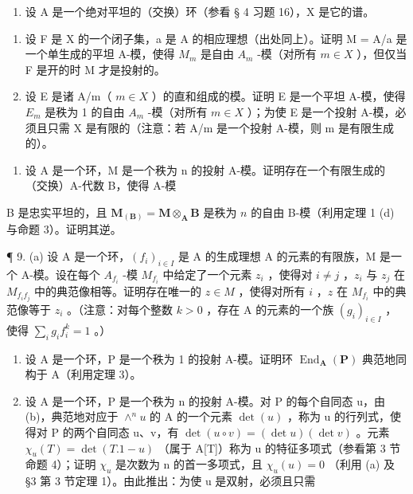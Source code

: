 \begin{enumerate}
\def\labelenumi{\arabic{enumi}.}
\setcounter{enumi}{6}
\tightlist
\item
  设 A 是一个绝对平坦的（交换）环（参看 § 4 习题 16），X 是它的谱。
\end{enumerate}

\begin{enumerate}
\def\labelenumi{(\alph{enumi})}
\item
  设 F 是 X 的一个闭子集，a 是 A 的相应理想（出处同上）。证明 M = A/a 是一个单生成的平坦 A-模，使得 \(M_{m}\) 是自由 \(A_{m}\) -模（对所有 \(m \in X\) ），但仅当 F 是开的时 M 才是投射的。
\item
  设 E 是诸 A/m（ \(m \in X\) ）的直和组成的模。证明 E 是一个平坦 A-模，使得 \(E_{m}\) 是秩为 1 的自由 \(A_{m}\) -模（对所有 \(m \in X\) ）；为使 E 是一个投射 A-模，必须且只需 X 是有限的（注意：若 A/m 是一个投射 A-模，则 m 是有限生成的）。
\end{enumerate}

\begin{enumerate}
\def\labelenumi{\arabic{enumi}.}
\setcounter{enumi}{7}
\tightlist
\item
  设 A 是一个环，M 是一个秩为 n 的投射 A-模。证明存在一个有限生成的（交换）A-代数 B，使得 A-模
\end{enumerate}

B 是忠实平坦的，且 \(\mathbf{M}_{(\mathbf{B})} = \mathbf{M} \otimes_{\mathbf{A}} \mathbf{B}\) 是秩为 \(n\) 的自由 B-模（利用定理 1 (d) 与命题 3）。证明其逆。

¶ 9. (a) 设 A 是一个环，\((f_i)_{i \in I}\) 是 A 的生成理想 A 的元素的有限族，M 是一个 A-模。设在每个 \(A_{f_i}\) -模 \(M_{f_i}\) 中给定了一个元素 \(z_i\) ，使得对 \(i \neq j\) ，\(z_i\) 与 \(z_j\) 在 \(M_{f_i f_j}\) 中的典范像相等。证明存在唯一的 \(z \in M\) ，使得对所有 \(i\) ，\(z\) 在 \(M_{f_i}\) 中的典范像等于 \(z_i\) 。（注意：对每个整数 \(k > 0\) ，存在 A 的元素的一个族 \((g_i)_{i \in I}\) ，使得 \(\sum_{i} g_i f_i^k = 1\) 。）

\begin{enumerate}
\def\labelenumi{(\alph{enumi})}
\setcounter{enumi}{1}
\item
  设 A 是一个环，P 是一个秩为 1 的投射 A-模。证明环 \(\operatorname{End}_{\mathbf{A}}(\mathbf{P})\) 典范地同构于 A（利用定理 3）。
\item
  设 A 是一个环，P 是一个秩为 n 的投射 A-模。对 P 的每个自同态 u，由 (b)，典范地对应于 \(\wedge^{n}u\) 的 A 的一个元素 \(\det(u)\) ，称为 u 的行列式，使得对 P 的两个自同态 u、v，有 \(\det(u \circ v) = (\det u)(\det v)\) 。元素 \(\chi_{u}(T) = \det(T.1 - u)\) （属于 A{[}T{]}）称为 u 的特征多项式（参看第 3 节命题 4）；证明 \(\chi_{u}\) 是次数为 n 的首一多项式，且 \(\chi_{u}(u) = 0\) （利用 (a) 及 §3 第 3 节定理 1）。由此推出：为使 u 是双射，必须且只需
\end{enumerate}

